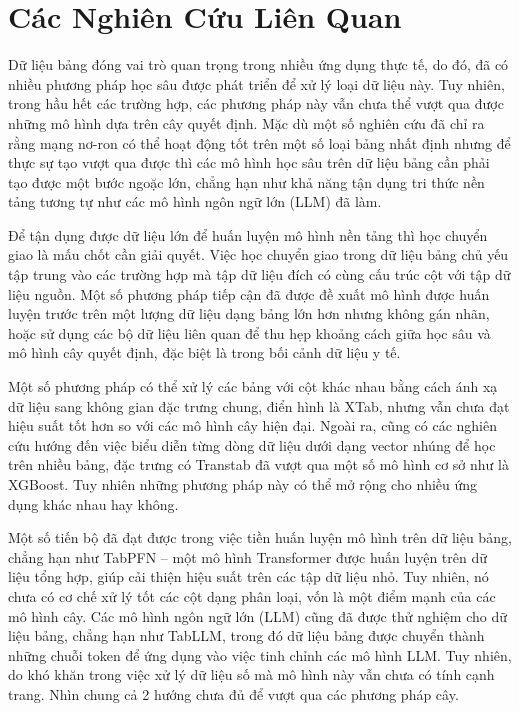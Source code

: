 \documentclass{article}
\begin{document}
\section{Các Nghiên Cứu Liên Quan}
Dữ liệu bảng đóng vai trò quan trọng trong nhiều ứng dụng thực tế, do đó, đã có nhiều phương pháp học sâu được phát triển để xử lý loại dữ liệu này. Tuy nhiên, trong hầu hết các trường hợp, các phương pháp này vẫn chưa thể vượt qua được những mô hình dựa trên cây quyết định. Mặc dù một số nghiên cứu đã chỉ ra rằng mạng nơ-ron có thể hoạt động tốt trên một số loại bảng nhất định nhưng để thực sự tạo vượt qua được thì các mô hình học sâu trên dữ liệu bảng cần phải tạo được một bước ngoặc lớn, chẳng hạn như khả năng tận dụng tri thức nền tảng tương tự như các mô hình ngôn ngữ lớn (LLM) đã làm.

Để tận dụng được dữ liệu lớn để huấn luyện mô hình nền tảng thì học chuyển giao là mấu chốt cần giải quyết. Việc học chuyển giao trong dữ liệu bảng chủ yếu tập trung vào các trường hợp mà tập dữ liệu đích có cùng cấu trúc cột với tập dữ liệu nguồn. Một số phương pháp tiếp cận đã được đề xuất mô hình được huấn luyện trước trên một lượng dữ liệu dạng bảng lớn hơn nhưng không gán nhãn, hoặc sử dụng các bộ dữ liệu liên quan để thu hẹp khoảng cách giữa học sâu và mô hình cây quyết định, đặc biệt là trong bối cảnh dữ liệu y tế. 

Một số phương pháp có thể xử lý các bảng với cột khác nhau bằng cách ánh xạ dữ liệu sang không gian đặc trưng chung, điển hình là XTab, nhưng vẫn chưa đạt hiệu suất tốt hơn so với các mô hình cây hiện đại. Ngoài ra, cũng có các nghiên cứu hướng đến việc biểu diễn từng dòng dữ liệu dưới dạng vector nhúng để học trên nhiều bảng, đặc trưng có Transtab đã vượt qua một số mô hình cơ sở như là XGBoost. Tuy nhiên những phương pháp này có thể mở rộng cho nhiều ứng dụng khác nhau hay không.

Một số tiến bộ đã đạt được trong việc tiền huấn luyện mô hình trên dữ liệu bảng, chẳng hạn như TabPFN – một mô hình Transformer được huấn luyện trên dữ liệu tổng hợp, giúp cải thiện hiệu suất trên các tập dữ liệu nhỏ. Tuy nhiên, nó chưa có cơ chế xử lý tốt các cột dạng phân loại, vốn là một điểm mạnh của các mô hình cây. Các mô hình ngôn ngữ lớn (LLM) cũng đã được thử nghiệm cho dữ liệu bảng, chẳng hạn như TabLLM, trong đó dữ liệu bảng được chuyển thành những chuỗi token để ứng dụng vào việc tinh chỉnh các mô hình LLM. Tuy nhiên, do khó khăn trong việc xử lý dữ liệu số mà mô hình này vẫn chưa có tính cạnh trang. Nhìn chung cả 2 hướng chưa đủ để vượt qua các phương pháp cây. 
\end{document}
